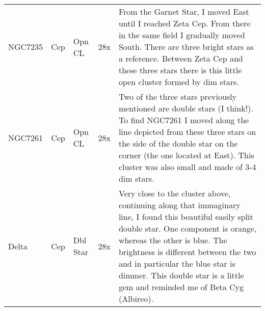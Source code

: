 \begin{longtable}{ p{0.7in}  p{0.3in}  p{0.6in}  p{0.9in}  p{5.8in} }
NGC7235 & Cep & Opn CL & 28x & From the Garnet Star, I moved East until I reached Zeta Cep. From there in the same field I gradually moved South. There are three bright stars as a reference. Between Zeta Cep and these three stars there is this little open cluster formed by dim stars.  \\ 
NGC7261 & Cep & Opn CL & 28x & Two of the three stars previously mentioned are double stars (I think!). To find NGC7261 I moved along the line depicted from these three stars on the side of the double star on the corner (the one located at East). This cluster was also small and made of 3-4 dim stars.  \\ 
Delta & Cep & Dbl Star & 28x & Very close to the cluster above, continuing along that immaginary line, I found this beautiful easily split double star. One component is orange, whereas the other is blue. The brightness is different between the two and in particular the blue star is dimmer. This double star is a little gem and reminded me of Beta Cyg (Albireo). \\ 
\hline 
\end{longtable} 
